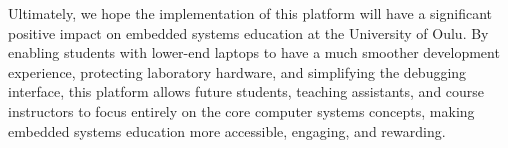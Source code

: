 Ultimately, we hope the implementation of this platform will have a significant positive impact on embedded systems education at the University of Oulu. By enabling students with lower-end laptops to have a much smoother development experience, protecting laboratory hardware, and simplifying the debugging interface, this platform allows future students, teaching assistants, and course instructors to focus entirely on the core computer systems concepts, making embedded systems education more accessible, engaging, and rewarding.
